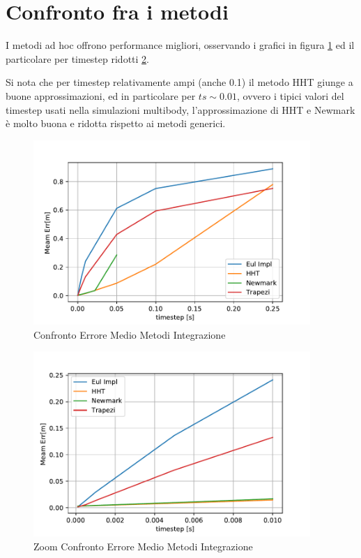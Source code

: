 \section{Confronto fra i metodi}
I metodi ad hoc offrono performance migliori, osservando i grafici in figura \ref{fig:ErrComp} ed il particolare per timestep ridotti \ref{fig:ErrComp_zoom}. 

Si nota che per timestep relativamente ampi (anche 0.1) il metodo HHT giunge a buone approssimazioni, ed in particolare per $ts \sim 0.01$, ovvero i tipici valori del timestep usati nella simulazioni multibody, l'approssimazione di HHT e Newmark è molto buona e ridotta rispetto ai metodi generici.
\begin{figure}[h!]
\centering
\includegraphics[height=7cm]{Figure/Convergenza/ErrComp.pdf}
\caption{Confronto Errore Medio Metodi Integrazione}
 \label{fig:ErrComp}
\end{figure}

\begin{figure}[h!]
\centering
\includegraphics[height=7cm]{Figure/Convergenza/ErrComp_zoom.pdf}
\caption{Zoom Confronto Errore Medio Metodi Integrazione}
 \label{fig:ErrComp_zoom}
\end{figure}